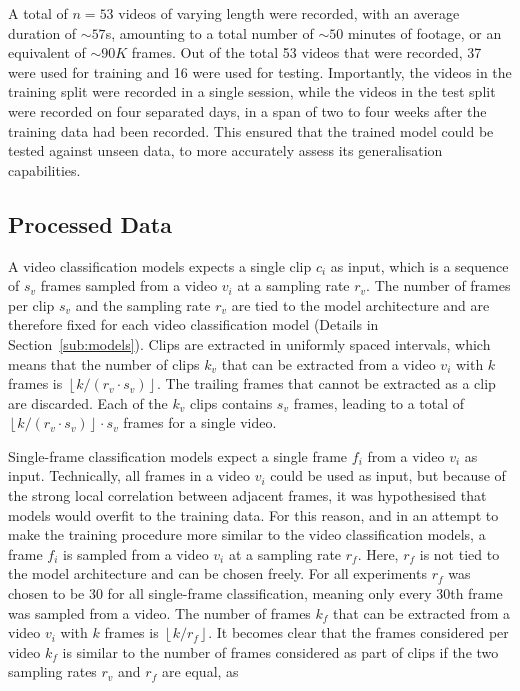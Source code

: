 \documentclass[a4paper]{article}
\begin{document}
A total of $n=53$ videos of varying length were recorded, with an average
duration of $\sim 57$s, amounting to a total number of $\sim 50$ minutes of
footage, or an equivalent of $\sim 90K$ frames. Out of the total 53 videos
that were recorded, 37 were used for training and 16 were used for testing.
Importantly, the videos in the training split were recorded in a single
session, while the videos in the test split were recorded on four separated
days, in a span of two to four weeks after the training data had been
recorded. This ensured that the trained model could be tested against unseen
data, to more accurately assess its generalisation capabilities.



\subsection{Processed Data} %
\label{sub:processed-data}

A video classification models expects a single clip $c_i$ as input, which is a
sequence of $s_v$ frames sampled from a video $v_i$ at a sampling rate $r_v$.
The number of frames per clip $s_v$ and the sampling rate $r_v$ are tied to
the model architecture and are therefore fixed for each video classification
model (Details in Section~\ref{sub:models}). Clips are extracted in uniformly
spaced intervals, which means that the number of clips $k_v$ that can be
extracted from a video $v_i$ with $k$ frames is $\left\lfloor k / (r_v \cdot
s_v) \right\rfloor$. The trailing frames that cannot be extracted as a clip
are discarded. Each of the $k_v$ clips contains $s_v$ frames, leading to a
total of $\left\lfloor k / (r_v \cdot s_v) \right\rfloor \cdot s_v$ frames for
a single video. 

Single-frame classification models expect a single frame $f_i$ from a video
$v_i$ as input. Technically, all frames in a video $v_i$ could be used as
input, but because of the strong local correlation between adjacent frames, it
was hypothesised that models would overfit to the training data. For this
reason, and in an attempt to make the training procedure more similar to the
video classification models, a frame $f_i$ is sampled from a video $v_i$ at a
sampling rate $r_f$. Here, $r_f$ is not tied to the model architecture and can
be chosen freely. For all experiments $r_f$ was chosen to be $30$ for all
single-frame classification, meaning only every 30th frame was sampled from a
video. The number of frames $k_f$ that can be extracted from a video $v_i$
with $k$ frames is $\left\lfloor k / r_f \right\rfloor$. It becomes clear that
the frames considered per video $k_f$ is similar to the number of frames
considered as part of clips if the two sampling rates $r_v$ and $r_f$ are
equal, as
\end{document}
